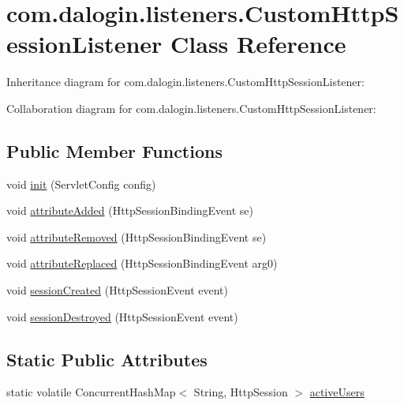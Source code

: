 \hypertarget{classcom_1_1dalogin_1_1listeners_1_1_custom_http_session_listener}{}\section{com.\+dalogin.\+listeners.\+Custom\+Http\+Session\+Listener Class Reference}
\label{classcom_1_1dalogin_1_1listeners_1_1_custom_http_session_listener}


Inheritance diagram for com.\+dalogin.\+listeners.\+Custom\+Http\+Session\+Listener\+:


Collaboration diagram for com.\+dalogin.\+listeners.\+Custom\+Http\+Session\+Listener\+:
\subsection*{Public Member Functions}
\begin{DoxyCompactItemize}
\item 
void \hyperlink{classcom_1_1dalogin_1_1listeners_1_1_custom_http_session_listener_adb3e24fc3d072d1a9e135dffa04d48ce}{init} (Servlet\+Config config)
\item 
void \hyperlink{classcom_1_1dalogin_1_1listeners_1_1_custom_http_session_listener_a7a1fbd8d65602f636a15d7d9d13b689d}{attribute\+Added} (Http\+Session\+Binding\+Event se)
\item 
void \hyperlink{classcom_1_1dalogin_1_1listeners_1_1_custom_http_session_listener_a94806449e76432447e383df8f06b28de}{attribute\+Removed} (Http\+Session\+Binding\+Event se)
\item 
void \hyperlink{classcom_1_1dalogin_1_1listeners_1_1_custom_http_session_listener_aa6252d0b85ea792494e99b333298b5cd}{attribute\+Replaced} (Http\+Session\+Binding\+Event arg0)
\item 
void \hyperlink{classcom_1_1dalogin_1_1listeners_1_1_custom_http_session_listener_aa48891b8ccf7caba4d0bcdaf635c3182}{session\+Created} (Http\+Session\+Event event)
\item 
void \hyperlink{classcom_1_1dalogin_1_1listeners_1_1_custom_http_session_listener_a764740ee9030536b11e91101a7599546}{session\+Destroyed} (Http\+Session\+Event event)
\end{DoxyCompactItemize}
\subsection*{Static Public Attributes}
\begin{DoxyCompactItemize}
\item 
static volatile Concurrent\+Hash\+Map$<$ String, Http\+Session $>$ \hyperlink{classcom_1_1dalogin_1_1listeners_1_1_custom_http_session_listener_ab05ca2cc5c3a555963bb18411aa1cfb1}{active\+Users}
\end{DoxyCompactItemize}


